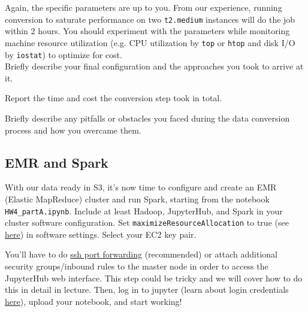 \begin{itemize}
    Again, the specific parameters are up to you. From our experience, running conversion to saturate performance on two \texttt{t2.medium} instances will do the job within 2 hours. You should experiment with the parameters while monitoring machine resource utilization (e.g. CPU utilization by \texttt{top} or \texttt{htop} and disk I/O by \texttt{iostat}) to optimize for cost. 
    \\ 
    \clearpage
    Briefly describe your final configuration and the approaches you took to arrive at it. 
    
    \begin{tcolorbox}[fit,height=6cm, blank, borderline={1pt}{-2pt},nobeforeafter]
    \end{tcolorbox}
    
    Report the time and cost the conversion step took in total. 
    
    \begin{tcolorbox}[fit,height=5cm, blank, borderline={1pt}{-2pt},nobeforeafter]
    \end{tcolorbox}
    
    Briefly describe any pitfalls or obstacles you faced during the data conversion process and how you overcame them. 
    
    \begin{tcolorbox}[fit,height=5cm, blank, borderline={1pt}{-2pt},nobeforeafter]
    \end{tcolorbox}
    
\end{itemize}

\clearpage

\subsection{EMR and Spark}

With our data ready in S3, it's now time to configure and create an EMR (Elastic MapReduce) cluster and run Spark, starting from the notebook \texttt{HW4\_partA.ipynb}. Include at least Hadoop, JupyterHub, and Spark in your cluster software configuration. Set \texttt{maximizeResourceAllocation} to true (see \href{https://docs.aws.amazon.com/emr/latest/ReleaseGuide/emr-spark-configure.html}{here}) in software settings. Select your EC2 key pair.

You'll have to do \href{https://docs.aws.amazon.com/emr/latest/ManagementGuide/emr-ssh-tunnel-local.html}{ssh port forwarding} (recommended) or attach additional security groups/inbound rules to the master node in order to access the JupyterHub web interface. This step could be tricky and we will cover how to do this in detail in lecture. Then, log in to jupyter (learn about login credentials \href{https://docs.aws.amazon.com/emr/latest/ReleaseGuide/emr-jupyterhub-user-access.html}{here}), upload your notebook, and start working!

